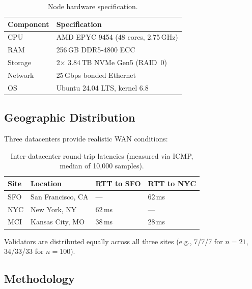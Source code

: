 \documentclass[11pt]{article}
\begin{document}
\begin{table}[h]
\centering
\begin{tabular}{@{}ll@{}}
\toprule
\textbf{Component} & \textbf{Specification} \\
\midrule
CPU & AMD EPYC 9454 (48 cores, 2.75\,GHz) \\
RAM & 256\,GB DDR5-4800 ECC \\
Storage & 2$\times$ 3.84\,TB NVMe Gen5 (RAID~0) \\
Network & 25\,Gbps bonded Ethernet \\
OS & Ubuntu 24.04 LTS, kernel 6.8 \\
\bottomrule
\end{tabular}
\caption{Node hardware specification.}
\label{tab:hardware}
\end{table}

\subsection{Geographic Distribution}

Three datacenters provide realistic WAN conditions:

\begin{table}[h]
\centering
\begin{tabular}{@{}llll@{}}
\toprule
\textbf{Site} & \textbf{Location} & \textbf{RTT to SFO} & \textbf{RTT to NYC} \\
\midrule
SFO & San Francisco, CA & ---       & 62\,ms \\
NYC & New York, NY      & 62\,ms   & --- \\
MCI & Kansas City, MO   & 38\,ms   & 28\,ms \\
\bottomrule
\end{tabular}
\caption{Inter-datacenter round-trip latencies (measured via ICMP, median of 10{,}000 samples).}
\label{tab:latency}
\end{table}

Validators are distributed equally across all three sites (e.g., 7/7/7 for $n=21$,
34/33/33 for $n=100$).

\subsection{Methodology}
\end{document}
